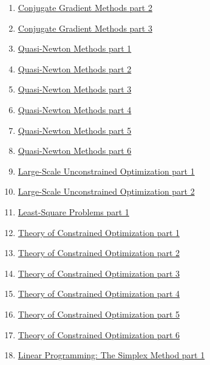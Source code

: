 \documentclass[11pt]{article}
\begin{document}
\begin{enumerate}
	\item \href{https://mp.weixin.qq.com/s/OYxhbVO-WcUFx1MMyGSJGQ}{Conjugate Gradient Methods part 2}	%
	\item \href{https://mp.weixin.qq.com/s/p0jk4WXMrfdYhQeNHq2Tmw}{Conjugate Gradient Methods part 3}	%
	\item \href{https://mp.weixin.qq.com/s/vkR8iyLbhxDFQ9HCBq5_vQ}{Quasi-Newton Methods part 1}	%
	\item \href{https://mp.weixin.qq.com/s/WTGiTcAPofSqFlQc3P7D_Q}{Quasi-Newton Methods part 2}	%
	\item \href{https://mp.weixin.qq.com/s/bSF7nlrqAHvc9Wkwelt1VA}{Quasi-Newton Methods part 3}	%
	\item \href{https://mp.weixin.qq.com/s/YLT-qEy8ZsC_47ak86qbzw}{Quasi-Newton Methods part 4}	%
	\item \href{https://mp.weixin.qq.com/s/MRzN3eu1uvkM2K9vn-MQig}{Quasi-Newton Methods part 5}	%
	\item \href{https://mp.weixin.qq.com/s/cwvwBRynXoBb_ETvSK2-jQ}{Quasi-Newton Methods part 6}	%
	\item \href{https://mp.weixin.qq.com/s/qsaDnfbbV1n2QzZ4vpfmGA}{Large-Scale Unconstrained Optimization part 1}	%
	\item \href{https://mp.weixin.qq.com/s/kh0g8yPy7IlvanCJm-FhHA}{Large-Scale Unconstrained Optimization part 2}	%
	\item \href{https://mp.weixin.qq.com/s/U1O8BN7RlA9VCcJGExjrTA}{Least-Square Problems part 1}	%
	\item \href{https://mp.weixin.qq.com/s/3gqyMFalO9a9iWWQwc0BBw}{Theory of Constrained Optimization part 1}	%
	\item \href{https://mp.weixin.qq.com/s/7WgxFH8bkN4c0pqcyeGrOQ}{Theory of Constrained Optimization part 2}	%
	\item \href{https://mp.weixin.qq.com/s/sjPqX5STKzaUmqPqSQGCkw}{Theory of Constrained Optimization part 3}	%
	\item \href{https://mp.weixin.qq.com/s/BRdXtC0HQXELwkfPI0cPvg}{Theory of Constrained Optimization part 4}	%
	\item \href{https://mp.weixin.qq.com/s/9Y2fApwowWvlufb-7YjSQA}{Theory of Constrained Optimization part 5}	%
	\item \href{https://mp.weixin.qq.com/s/3OP1p1UejXgsjLbrw1_2Wg}{Theory of Constrained Optimization part 6}	%
	\item \href{https://mp.weixin.qq.com/s/t3NKT1fjHxgeVUgtp5pR6A}{Linear Programming: The Simplex Method part 1}	%

\end{enumerate}
\end{document}
